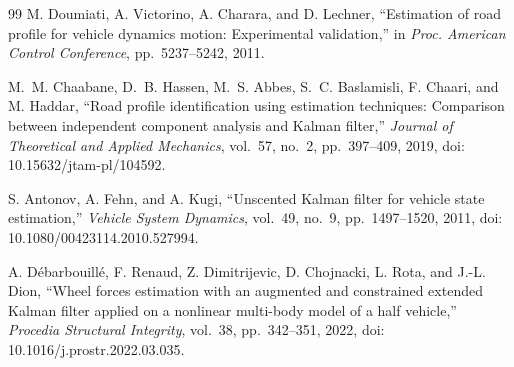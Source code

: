 \documentclass[letterpaper,10pt,journal,twocolumn]{ieeeconf}
\begin{document}
\begin{thebibliography}{99}
M. Doumiati, A. Victorino, A. Charara, and D. Lechner,
``Estimation of road profile for vehicle dynamics motion:
Experimental validation,'' in \emph{Proc. American Control Conference},
pp.~5237--5242, 2011.

M.~M. Chaabane, D.~B. Hassen, M.~S. Abbes, S.~C. Baslamisli,
F. Chaari, and M. Haddar, ``Road profile identification using
estimation techniques: Comparison between independent component
analysis and Kalman filter,'' \emph{Journal of Theoretical and Applied
Mechanics}, vol.~57, no.~2, pp.~397--409, 2019,
doi: 10.15632/jtam-pl/104592.

S. Antonov, A. Fehn, and A. Kugi, ``Unscented Kalman filter for
vehicle state estimation,'' \emph{Vehicle System Dynamics}, vol.~49,
no.~9, pp.~1497--1520, 2011,
doi: 10.1080/00423114.2010.527994.

A. D\'ebarbouill\'e, F. Renaud, Z. Dimitrijevic, D. Chojnacki,
L. Rota, and J.-L. Dion, ``Wheel forces estimation with an augmented
and constrained extended Kalman filter applied on a nonlinear
multi-body model of a half vehicle,'' \emph{Procedia Structural
Integrity}, vol.~38, pp.~342--351, 2022,
doi: 10.1016/j.prostr.2022.03.035.

\end{thebibliography}
\end{document}
